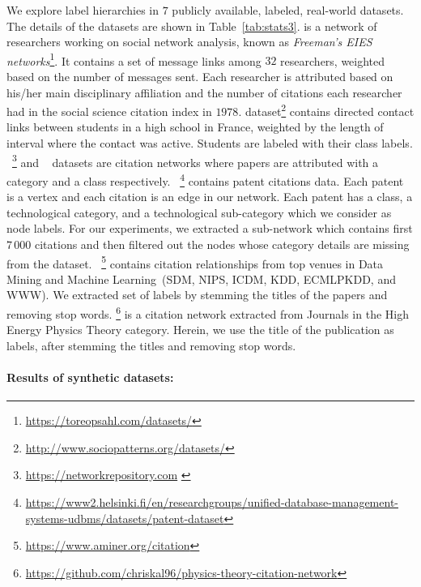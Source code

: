 We explore label hierarchies in $7$ publicly available, labeled, real-world datasets. The details of the  datasets  are shown in Table~\ref{tab:stats3}.  is a  network of researchers working on social network analysis, known as \emph{Freeman's EIES networks}\footnote{\url{https://toreopsahl.com/datasets/}}. It contains a set of message links among $32$ researchers, weighted based on the number of messages sent. Each researcher is attributed based on his/her main disciplinary affiliation and the number of citations each researcher had in the social science citation index in $1978$.
 dataset\footnote{\url{http://www.sociopatterns.org/datasets/} } 
contains directed contact links between students in a high school in France, weighted by the length of interval where the contact was active. Students are labeled with their class labels. 
~\cite{nr2015}\footnote{\url{https://networkrepository.com} \label{foot:nw-repo}}  and ~\cite{nr2015} datasets are citation networks where papers are attributed with a category and a class respectively.
~\cite{UDMS_dataset}\footnote{\url{https://www2.helsinki.fi/en/researchgroups/unified-database-management-systems-udbms/datasets/patent-dataset}}  contains patent citations data.
Each patent is a vertex and each citation is an edge in our network. Each patent has a class, a technological
category, and a technological sub-category which we consider as node labels. For our experiments, we extracted a sub-network which contains first $7\,000$ citations and then filtered out the nodes whose category details are missing from the dataset.
~\cite{tang2008arnetminer}\footnote{\url{https://www.aminer.org/citation}} contains  citation relationships from top venues in Data Mining and Machine Learning~(SDM, NIPS, ICDM, KDD, ECMLPKDD, and WWW). We extracted set of labels by stemming the titles of the papers and removing stop words. \footnote{\url{https://github.com/chriskal96/physics-theory-citation-network}} is a citation network  extracted from Journals in the High Energy Physics Theory category. Herein, we use the title of the publication as labels, after stemming the titles and removing stop words. 
 



\paragraph{Results of synthetic datasets:}

